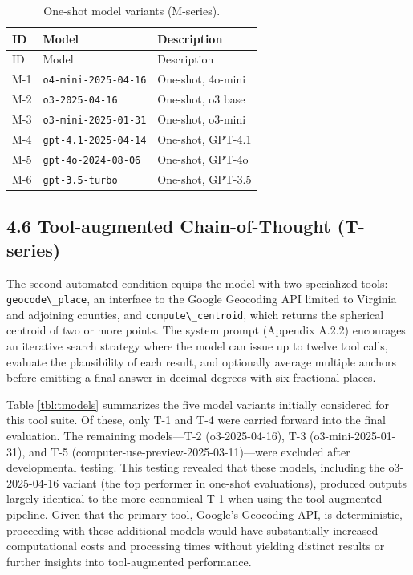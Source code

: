 \begin{longtable}[]{@{}lll@{}}
\caption{\label{tbl:mmodels}One-shot model variants
(M-series).}\tabularnewline
\toprule\noalign{}
ID & Model & Description \\
\midrule\noalign{}
\endfirsthead
\toprule\noalign{}
ID & Model & Description \\
\midrule\noalign{}
\endhead
\bottomrule\noalign{}
\endlastfoot
M-1 & \passthrough{\lstinline!o4-mini-2025-04-16!} & One-shot,
4o-mini \\
M-2 & \passthrough{\lstinline!o3-2025-04-16!} & One-shot, o3 base \\
M-3 & \passthrough{\lstinline!o3-mini-2025-01-31!} & One-shot,
o3-mini \\
M-4 & \passthrough{\lstinline!gpt-4.1-2025-04-14!} & One-shot,
GPT-4.1 \\
M-5 & \passthrough{\lstinline!gpt-4o-2024-08-06!} & One-shot, GPT-4o \\
M-6 & \passthrough{\lstinline!gpt-3.5-turbo!} & One-shot, GPT-3.5 \\
\end{longtable}

\subsection{4.6 Tool-augmented Chain-of-Thought
(T-series)}\label{tool-augmented-chain-of-thought-t-series}

The second automated condition equips the model with two specialized
tools: \passthrough{\lstinline!geocode\_place!}, an interface to the
Google Geocoding API limited to Virginia and adjoining counties, and
\passthrough{\lstinline!compute\_centroid!}, which returns the spherical
centroid of two or more points. The system prompt (Appendix A.2.2)
encourages an iterative search strategy where the model can issue up to
twelve tool calls, evaluate the plausibility of each result, and
optionally average multiple anchors before emitting a final answer in
decimal degrees with six fractional places.

Table \ref{tbl:tmodels} summarizes the five model variants initially
considered for this tool suite. Of these, only T-1 and T-4 were carried
forward into the final evaluation. The remaining models---T-2
(o3-2025-04-16), T-3 (o3-mini-2025-01-31), and T-5
(computer-use-preview-2025-03-11)---were excluded after developmental
testing. This testing revealed that these models, including the
o3-2025-04-16 variant (the top performer in one-shot evaluations),
produced outputs largely identical to the more economical T-1 when using
the tool-augmented pipeline. Given that the primary tool, Google's
Geocoding API, is deterministic, proceeding with these additional models
would have substantially increased computational costs and processing
times without yielding distinct results or further insights into
tool-augmented performance.

